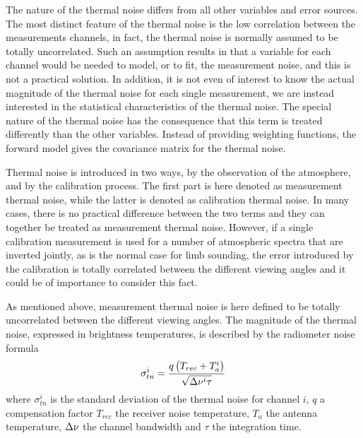  \label{sec:measerr:tn}
 
 The nature of the thermal noise differs from all other variables and
 error sources. The most distinct feature of the thermal noise is the
 low correlation between the measurements channels, in fact, the
 thermal noise is normally assumed to be totally uncorrelated. Such an
 assumption results in that a variable for each channel would be
 needed to model, or to fit, the measurement noise, and this is not a
 practical solution. In addition, it is not even of interest to know
 the actual magnitude of the thermal noise for each single
 measurement, we are instead interested in the statistical
 characteristics of the thermal noise.  The special nature of the
 thermal noise has the consequence that this term is treated
 differently than the other variables. Instead of providing weighting
 functions, the forward model gives the covariance matrix for the
 thermal noise.
 
 Thermal noise is introduced in two ways, by the observation of the
 atmosphere, and by the calibration process. The first part is here
 denoted as measurement thermal noise, while the latter is denoted as
 calibration thermal noise. In many cases, there is no practical
 difference between the two terms and they can together be treated as
 measurement thermal noise. However, if a single calibration
 measurement is used for a number of atmospheric spectra that are
 inverted jointly, as is the normal case for limb sounding, the error
 introduced by the calibration is totally correlated between the
 different viewing angles and it could be of importance to consider
 this fact.
 

 \label{sec:measerr:mtn}
 
 As mentioned above, measurement thermal noise is here defined to be
 totally uncorrelated between the different viewing angles.  The
 magnitude of the thermal noise, expressed in brightness temperatures,
 is described by the radiometer noise formula
 \begin{equation}
   \sigma_{tn}^i = \frac{q\left(T_{rec}+T_a^i\right)}{\sqrt{\Delta \nu^i \tau}}
  \label{eq:measerr:tn}
 \end{equation}
 where $\sigma_{tn}^i$ is the standard deviation of the thermal noise
 for channel $i$, $q$ a compensation factor $T_{rec}$ the receiver
 noise temperature, $T_a$ the antenna temperature, $\Delta \nu$ the
 channel bandwidth and $\tau$ the integration time.
 
